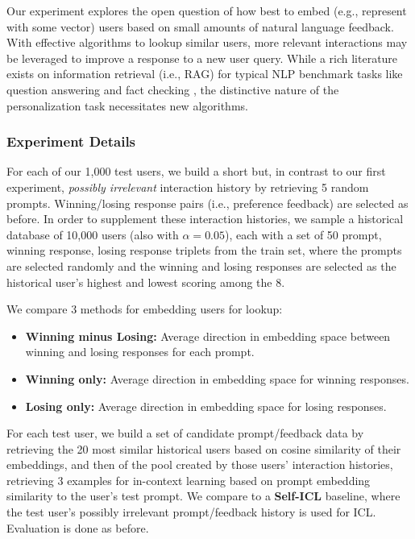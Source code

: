 Our experiment explores the open question of how best to embed (e.g., represent with some vector) users based on small amounts of natural language feedback.  
With effective algorithms to lookup similar users, more relevant interactions may be leveraged to improve a response to a new user query.
While a rich literature exists on information retrieval (i.e., RAG) for typical NLP benchmark tasks like question answering and fact checking \citep{lewis2021retrievalaugmentedgenerationknowledgeintensivenlp, gao2024retrievalaugmentedgenerationlargelanguage}, the distinctive nature of the personalization task necessitates new algorithms.

\subsubsection{Experiment Details}

For each of our 1,000 test users, we build a short but, in contrast to our first experiment, \textit{possibly irrelevant} interaction history by retrieving 5 random prompts.  Winning/losing response pairs (i.e., preference feedback) are selected as before.  In order to supplement these interaction histories, we sample a historical database of 10,000 users (also with $\alpha=0.05$), each with a set of 50 prompt, winning response, losing response triplets from the train set, where the prompts are selected randomly and the winning and losing responses are selected as the historical user's highest and lowest scoring among the 8.

We compare 3 methods for embedding users for lookup:
\begin{itemize}
    \item \textbf{Winning minus Losing:} Average direction in embedding space between winning and losing responses for each prompt.
    \item \textbf{Winning only:} Average direction in embedding space for winning responses. 
    \item \textbf{Losing only:} Average direction in embedding space for losing responses.
\end{itemize}

For each test user, we build a set of candidate prompt/feedback data by retrieving the 20 most similar historical users based on cosine similarity of their embeddings, and then of the pool created by those users' interaction histories, retrieving 3 examples for in-context learning based on prompt embedding similarity to the user's test prompt.  We compare to a \textbf{Self-ICL} baseline, where the test user's possibly irrelevant prompt/feedback history is used for ICL.  Evaluation is done as before.

